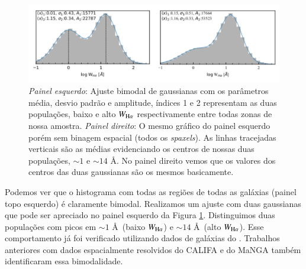 \begin{figure}
  \includegraphics[scale=0.9]{figuras/bimodalWHa_model_both.pdf}
\caption[Ajuste gaussiano de $W_{{\rm H}\alpha}$]
{{\em Painel esquerdo}: Ajuste bimodal de gaussianas com os parâmetros média, desvio padrão e amplitude, índices 1 e 2 representam as duas populações, baixo e alto $W_{\Ha}$ respectivamente entre todas zonas de nossa amostra. {\em Painel direito}: O mesmo gráfico do painel esquerdo porém sem binagem espacial (todos os {\em spaxels}). As linhas tracejadas verticais são as médias evidenciando os centros de nossas duas populações, $\sim 1$ e $\sim 14$ \AA. No painel direito vemos que os valores dos centros das duas gaussianas são os mesmos basicamente.}
 \label{fig:bimodal_model}
\end{figure}

Podemos ver que o histograma com todas as regiões de todas as galáxias (painel topo esquerdo) é claramente bimodal. Realizamos um ajuste com duas gaussianas que pode ser apreciado no painel esquerdo da Figura \ref{fig:bimodal_model}. Distinguimos duas populações com picos em $\sim 1$ \AA\ (baixo $W_{\Ha}$) e $\sim 14$ \AA\ (alto $W_{\Ha}$). Esse comportamento já foi verificado utilizando dados de galáxias do \SDSS \citep{Bamford.etal.2008a, CidFernandes.etal.2011a}. Trabalhos anteriores com dados espacialmente resolvidos do CALIFA \citep{Morisset.etal.2016} e do MaNGA \citep{Belfiore.etal.2016, Belfiore.etal.2017} também identificaram essa bimodalidade.


